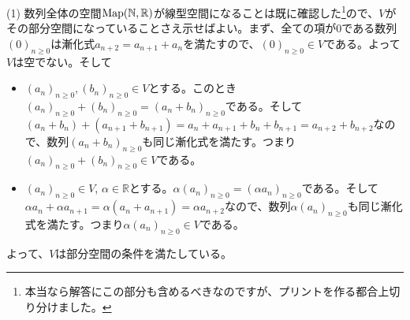 \noindent (1) 数列全体の空間$\operatorname{Map}(\mathbb{N}, \mathbb{R})$が線型空間になることは既に確認した\footnote{本当なら解答にこの部分も含めるべきなのですが、プリントを作る都合上切り分けました。}ので、$V$がその部分空間になっていることさえ示せばよい。まず、全ての項が$0$である数列$(0)_{n \geq 0}$は漸化式$a_{n+2} = a_{n + 1} + a_n$を満たすので、$(0)_{n \geq 0}\in V$である。よって$V$は空でない。そして
\begin{itemize}
\item $(a_n)_{n\geq 0}, (b_n)_{n\geq 0}\in V$とする。このとき$(a_n)_{n\geq 0} + (b_n)_{n\geq 0} = (a_n + b_n)_{n\geq 0}$である。そして$(a_n + b_n) + (a_{n+1} + b_{n+1}) = a_n + a_{n+1} + b_n + b_{n+1} = a_{n+2} + b_{n+2}$なので、数列$(a_n + b_n)_{n\geq 0}$も同じ漸化式を満たす。つまり$(a_n)_{n \geq 0} + (b_n)_{n \geq 0} \in V$である。
\item $(a_n)_{n\geq 0}\in V$, $\alpha\in\mathbb{R}$とする。$\alpha (a_n)_{n\geq 0} = (\alpha a_n)_{n\geq 0}$である。そして$\alpha a_n + \alpha a_{n+1} = \alpha (a_n + a_{n+1}) = \alpha a_{n+2}$なので、数列$\alpha (a_n)_{n\geq 0}$も同じ漸化式を満たす。つまり$\alpha (a_n)_{n \geq 0}\in V$である。
\end{itemize}
よって、$V$は部分空間の条件を満たしている。

